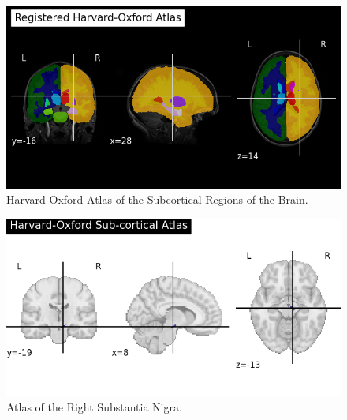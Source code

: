 \documentclass[12pt]{article}
\begin{document}
\begin{figure}[h]  %
    \centering
    \includegraphics[width=\textwidth]{"../img/regions.png"}  %
    \caption{Harvard-Oxford Atlas of the Subcortical Regions of the Brain.}
    \label{fig:subcortex}  %
\end{figure}

\FloatBarrier  %

\begin{figure}[h]  %
    \centering
    \includegraphics[width=\textwidth]{"../img/brain_atlas.png"}  %
    \caption{Atlas of the Right Substantia Nigra.}
    \label{fig:SNR}  %
\end{figure}

\FloatBarrier  %
\end{document}
